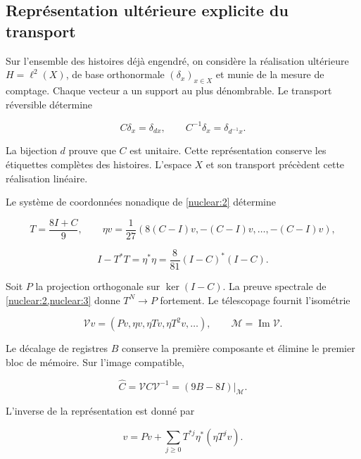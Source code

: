 \subsection{Représentation ultérieure explicite du transport
}

Sur l’ensemble des histoires déjà engendré, on considère la réalisation
ultérieure \(H=\ell^2(X)\), de base orthonormale
\((\delta_x)_{x\in X}\) et munie de la mesure de comptage. Chaque vecteur a un support
au plus dénombrable. Le transport réversible détermine



\[
C\delta_x=\delta_{d x},\qquad C^{-1}\delta_x=\delta_{d^{-1}x}.
\]



La bijection \(d\) prouve que \(C\) est unitaire.
Cette représentation conserve les étiquettes complètes des histoires.
L’espace \(X\) et son transport précèdent cette réalisation linéaire.


Le système de coordonnées nonadique de \cref{nuclear:2} détermine



\[
T=\frac{8I+C}{9},\qquad
\eta v=\frac1{27}(8(C-I)v,-(C-I)v,\ldots,-(C-I)v),
\]





\[
I-T^*T=\eta^*\eta=\frac8{81}(I-C)^*(I-C).
\]



Soit \(P\) la projection orthogonale sur \(\ker(I-C)\).
La preuve spectrale de \cref{nuclear:2,nuclear:3} donne
\(T^N\to P\) fortement. Le télescopage fournit l’isométrie



\[
\mathcal Vv=(Pv,\eta v,\eta Tv,\eta T^2v,\ldots),\qquad
\mathcal M=\operatorname{Im}\mathcal V.
\]



Le décalage de registres \(B\) conserve la première composante
et élimine le premier bloc de mémoire. Sur l’image compatible,




\begin{equation}
\boxed{\widehat C=\mathcal VC\mathcal V^{-1}
=(9B-8I)|_{\mathcal M}.}
\label{nuc09:transporte-recuperado}
\end{equation}



L’inverse de la représentation est donné par



\begin{equation}
v=Pv+\sum_{j\ge0}T^{*j}\eta^*(\eta T^jv).
\label{nuc09:inversa-registro}
\end{equation}



